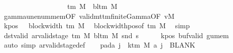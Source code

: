 \begin{isabellebody}
\ \ \ \ \ \ \ \ \ \ \ \ \ \ \ \ \ \ {\isasymin}\ {\isasymGamma}{\isacharunderscore}{\kern0pt}tm\ M\ {\isasymunion}\ {\isacharbraceleft}{\kern0pt}bl{\isacharunderscore}{\kern0pt}tm\ M{\isacharbraceright}{\kern0pt}{\isachardoublequoteclose}\isanewline
\ \ \ \ \isamarkupfalse%
\ gamma{\isacharunderscore}{\kern0pt}unenum{\isacharunderscore}{\kern0pt}mem{\isacharbrackleft}{\kern0pt}OF\ valid{\isacharunderscore}{\kern0pt}mttm{\isacharunderscore}{\kern0pt}finite{\isacharunderscore}{\kern0pt}Gamma{\isacharbrackleft}{\kern0pt}OF\ vM{\isacharbrackright}{\kern0pt}{\isacharbrackright}{\kern0pt}\ \isakeywordONE{{\isachardot}{\kern0pt}}\isamarkupfalse%
\isanewline
\ \ \isamarkupfalse%
\ kpos{\isacharcolon}{\kern0pt}\ {\isachardoublequoteopen}{}\ {\isacharless}{\kern0pt}\ block{\isacharunderscore}{\kern0pt}width\ {\isacharparenleft}{\kern0pt}{\isasymGamma}{\isacharunderscore}{\kern0pt}tm\ M{\isacharparenright}{\kern0pt}{\isachardoublequoteclose}\ \isamarkupfalse%
\ block{\isacharunderscore}{\kern0pt}width{\isacharunderscore}{\kern0pt}pos{\isacharbrackleft}{\kern0pt}of\ {\isachardoublequoteopen}{\isasymGamma}{\isacharunderscore}{\kern0pt}tm\ M{\isachardoublequoteclose}{\isacharbrackright}{\kern0pt}\ \isamarkupfalse%
\ simp\isanewline
\ \ \isamarkupfalse%
\ dst{\isacharunderscore}{\kern0pt}valid{\isacharcolon}{\kern0pt}\ {\isachardoublequoteopen}ar{\isacharunderscore}{\kern0pt}valid{\isacharunderscore}{\kern0pt}stage\ {\isacharparenleft}{\kern0pt}{\isasymGamma}{\isacharunderscore}{\kern0pt}tm\ M{\isacharparenright}{\kern0pt}\ {\isacharparenleft}{\kern0pt}bl{\isacharunderscore}{\kern0pt}tm\ M{\isacharparenright}{\kern0pt}\ {\isacharparenleft}{\kern0pt}snd\ {\isacharquery}{\kern0pt}s{\isacharprime}{\kern0pt}{\isacharparenright}{\kern0pt}{\isachardoublequoteclose}\isanewline
\ \ \ \ \isamarkupfalse%
\ kpos\ buf{\isacharunderscore}{\kern0pt}valid\ gu{\isacharunderscore}{\kern0pt}mem\ \isamarkupfalse%
\ {\isacharparenleft}{\kern0pt}auto\ simp{\isacharcolon}{\kern0pt}\ ar{\isacharunderscore}{\kern0pt}valid{\isacharunderscore}{\kern0pt}stage{\isacharunderscore}{\kern0pt}def{\isacharparenright}{\kern0pt}\isanewline
\ \ \isamarkupfalse%
\ pad{\isacharunderscore}{\kern0pt}a{\isacharcolon}{\kern0pt}\ {\isachardoublequoteopen}{\isasymforall}j\ {\isasymge}\ k{\isacharunderscore}{\kern0pt}tm\ M{\isachardot}{\kern0pt}\ {\isacharquery}{\kern0pt}a\ j\ {\isacharequal}{\kern0pt}\ BLANK{}{\isachardoublequoteclose}\ \isamarkupfalse%

\end{isabellebody}
